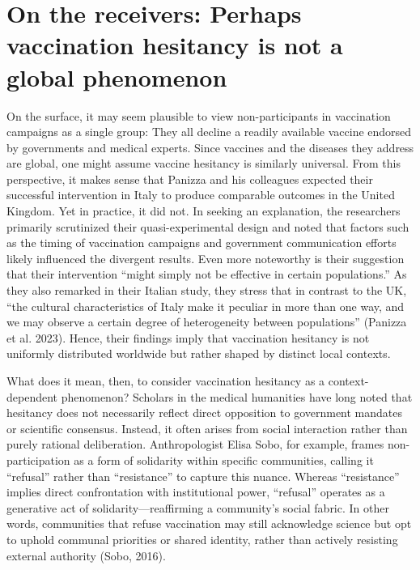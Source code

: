 \documentclass[authordate, reflection,issue]{jote-new-article}
\begin{document}
	\section{On the receivers: Perhaps vaccination hesitancy is not a global phenomenon}



	On the surface, it may seem plausible to view non-participants in vaccination campaigns as a single group: They all decline a readily available vaccine endorsed by governments and medical experts. Since vaccines and the diseases they address are global, one might assume vaccine hesitancy is similarly universal. From this perspective, it makes sense that Panizza and his colleagues expected their successful intervention in Italy to produce comparable outcomes in the United Kingdom. Yet in practice, it did not. In seeking an explanation, the researchers primarily scrutinized their quasi-experimental design and noted that factors such as the timing of vaccination campaigns and government communication efforts likely influenced the divergent results. Even more noteworthy is their suggestion that their intervention “might simply not be effective in certain populations.” As they also remarked in their Italian study, they stress that in contrast to the UK, “the cultural characteristics of Italy make it peculiar in more than one way, and we may observe a certain degree of heterogeneity between populations” (Panizza et al. 2023). Hence, their findings imply that vaccination hesitancy is not uniformly distributed worldwide but rather shaped by distinct local contexts.







	What does it mean, then, to consider vaccination hesitancy as a context-dependent phenomenon? Scholars in the medical humanities have long noted that hesitancy does not necessarily reflect direct opposition to government mandates or scientific consensus. Instead, it often arises from social interaction rather than purely rational deliberation. Anthropologist Elisa Sobo, for example, frames non-participation as a form of solidarity within specific communities, calling it “refusal” rather than “resistance” to capture this nuance. Whereas “resistance” implies direct confrontation with institutional power, “refusal” operates as a generative act of solidarity—reaffirming a community's social fabric. In other words, communities that refuse vaccination may still acknowledge science but opt to uphold communal priorities or shared identity, rather than actively resisting external authority (Sobo, 2016).
\end{document}
